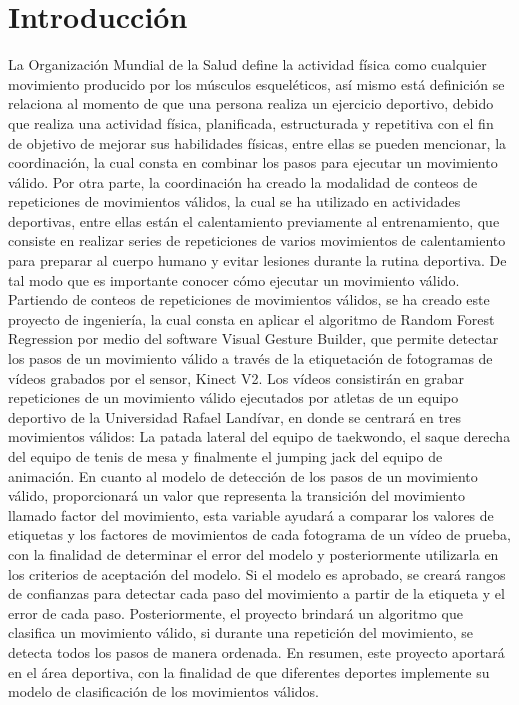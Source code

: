 \afterpage{\blankpage}
\newpage
\chapter{Introducci\'on}
La Organizaci\'on Mundial de la Salud define la actividad f\'isica como cualquier movimiento producido por los m\'usculos esquel\'eticos, as\'i mismo est\'a definici\'on se relaciona al momento de que una persona realiza un ejercicio deportivo, debido que realiza una actividad f\'isica,  planificada, estructurada y repetitiva con el fin de objetivo de mejorar sus habilidades f\'isicas, entre ellas se pueden mencionar, la coordinaci\'on, la cual consta en combinar los pasos para ejecutar un movimiento v\'alido.
\medbreak
Por otra parte, la coordinaci\'on ha creado la modalidad de conteos de repeticiones de movimientos   v\'alidos, la cual se ha utilizado en actividades  deportivas, entre ellas est\'an el calentamiento previamente al entrenamiento, que consiste en realizar series de repeticiones de varios movimientos de calentamiento para preparar al cuerpo humano y evitar lesiones durante la rutina deportiva. De tal modo que es importante conocer c\'omo ejecutar un movimiento v\'alido.
\medbreak
Partiendo de conteos de repeticiones de movimientos v\'alidos, se ha creado este proyecto de ingenier\'ia, la cual consta en aplicar el algoritmo de Random Forest Regression por medio del software Visual Gesture Builder, que permite detectar los pasos de un movimiento v\'alido a trav\'es de la etiquetaci\'on de fotogramas de v\'ideos grabados por el sensor, Kinect V2.
\medbreak
Los v\'ideos consistir\'an en grabar repeticiones de un movimiento v\'alido ejecutados por atletas de un equipo deportivo de la Universidad Rafael Land\'ivar, en donde se centrar\'a en tres movimientos v\'alidos: La patada lateral del equipo de taekwondo, el saque derecha del equipo de tenis de mesa y finalmente el jumping jack del equipo de animaci\'on.
\medbreak
En cuanto al modelo de detecci\'on de los pasos de un movimiento v\'alido, proporcionar\'a un valor que representa la transici\'on del movimiento llamado factor del movimiento, esta variable ayudar\'a a comparar los valores de etiquetas y los  factores de movimientos de cada fotograma de un v\'ideo de prueba, con la finalidad de determinar el error del modelo y posteriormente utilizarla en los criterios de aceptaci\'on del modelo.
\medbreak
Si el modelo es aprobado, se crear\'a rangos de confianzas para detectar cada paso del movimiento a partir de la etiqueta y el error de cada paso. Posteriormente, el proyecto brindar\'a un algoritmo que clasifica un movimiento v\'alido, si durante una repetici\'on del movimiento, se detecta todos los pasos de manera ordenada.
\medbreak
En resumen, este proyecto aportar\'a en el \'area deportiva, con la finalidad de que diferentes deportes implemente su modelo de clasificaci\'on de los movimientos v\'alidos.

